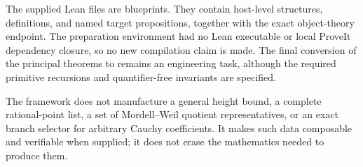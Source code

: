 The supplied Lean files are blueprints.  They contain host-level structures, definitions, and named
target propositions, together with the exact object-theory endpoint.  The preparation environment
had no Lean executable or local ProveIt dependency closure, so no new compilation claim is made.
The final conversion of the principal theorems to  remains an engineering task,
although the required primitive recursions and quantifier-free invariants are specified.

The framework does not manufacture a general height bound, a complete rational-point list, a set of
Mordell--Weil quotient representatives, or an exact branch selector for arbitrary Cauchy
coefficients.  It makes such data composable and verifiable when supplied; it does not erase the
mathematics needed to produce them.

